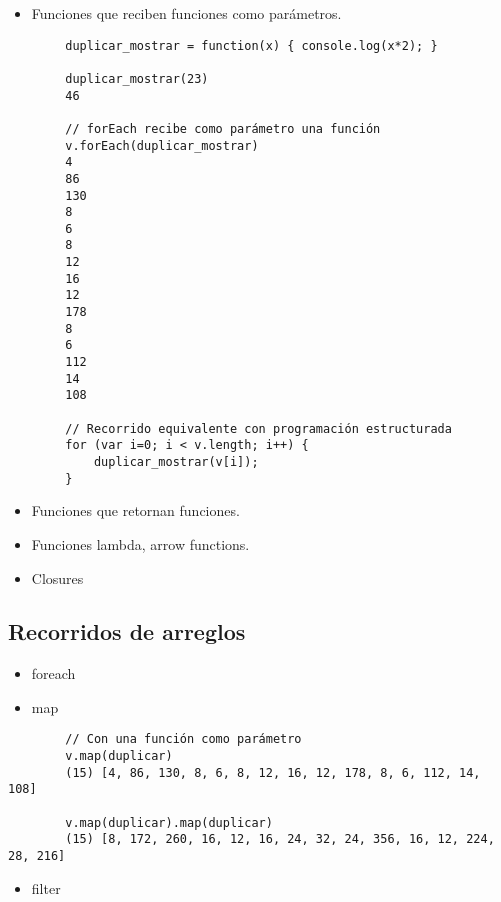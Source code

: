 \begin{itemize}
\tightlist
\item
  Funciones que reciben funciones como parámetros.
\end{itemize}

\begin{verbatim}
        duplicar_mostrar = function(x) { console.log(x*2); }

        duplicar_mostrar(23)
        46

        // forEach recibe como parámetro una función
        v.forEach(duplicar_mostrar)
        4
        86
        130
        8
        6
        8
        12
        16
        12
        178
        8
        6
        112
        14
        108

        // Recorrido equivalente con programación estructurada
        for (var i=0; i < v.length; i++) {
            duplicar_mostrar(v[i]);
        }
\end{verbatim}

\begin{itemize}
\tightlist
\item
  Funciones que retornan funciones.
\item
  Funciones lambda, arrow functions.
\item
  Closures
\end{itemize}

\hypertarget{recorridos-de-arreglos}{%
\subsection{Recorridos de arreglos}\label{recorridos-de-arreglos}}

\begin{itemize}
\tightlist
\item
  foreach
\item
  map
\end{itemize}

\begin{verbatim}
        // Con una función como parámetro
        v.map(duplicar)
        (15) [4, 86, 130, 8, 6, 8, 12, 16, 12, 178, 8, 6, 112, 14, 108]
        
        v.map(duplicar).map(duplicar)
        (15) [8, 172, 260, 16, 12, 16, 24, 32, 24, 356, 16, 12, 224, 28, 216]
\end{verbatim}

\begin{itemize}
\tightlist
\item
  filter
\end{itemize}


